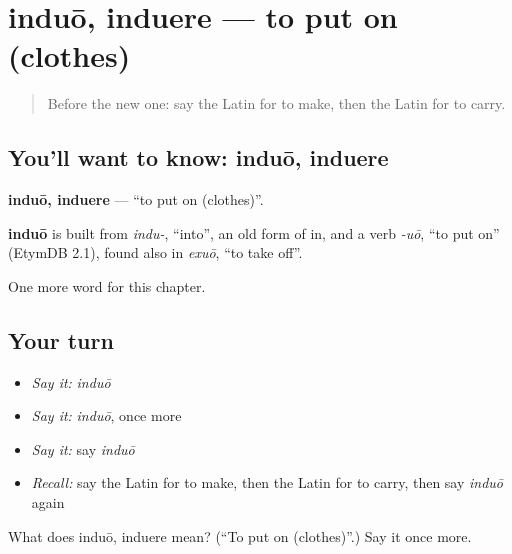 \section[induō, induere]{induō, induere — to put on (clothes)}

\label{lesson:LA-C155-induo}



\begin{quote}
Before the new one: say the Latin for to make, then the Latin for to carry.
\end{quote}

\subsection*{You'll want to know: induō, induere}
\textbf{induō, induere} — \textquotedblleft{}to put on (clothes)\textquotedblright{}.

\begin{cousinweb}
\textbf{induō} is built from \emph{indu-}, \textquotedblleft{}into\textquotedblright{}, an old form of in, and a verb \emph{-uō}, \textquotedblleft{}to put on\textquotedblright{} (EtymDB 2.1), found also in \emph{exuō}, \textquotedblleft{}to take off\textquotedblright{}.
\end{cousinweb}

\begin{grammarlens}[title={What you've built}]
One more word for this chapter.
\end{grammarlens}

\subsection*{Your turn}
\begin{itemize}
\raggedright
  \item \emph{Say it:} \emph{induō}
  \item \emph{Say it:} \emph{induō}, once more
  \item \emph{Say it:} say \emph{induō}
  \item \emph{Recall:} say the Latin for to make, then the Latin for to carry, then say \emph{induō} again
\end{itemize}

\begin{tcolorbox}[breakable,colback=teal!4,colframe=teal!35!black,title={Before you move on}]
What does induō, induere mean? (\textquotedblleft{}To put on (clothes)\textquotedblright{}.) Say it once more.
\end{tcolorbox}
